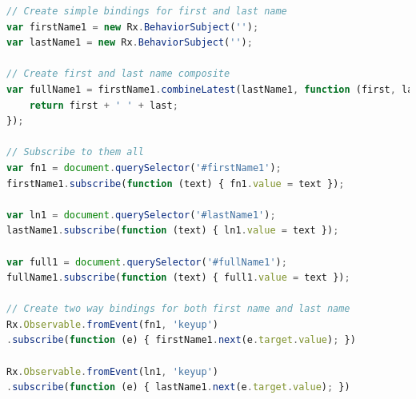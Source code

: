 \begin{lstlisting}[language=JavaScript, caption=RxJS - Databinding example, label={lst:rxjs-data-binding}]
// Create simple bindings for first and last name
var firstName1 = new Rx.BehaviorSubject('');
var lastName1 = new Rx.BehaviorSubject('');

// Create first and last name composite
var fullName1 = firstName1.combineLatest(lastName1, function (first, last) {
	return first + ' ' + last;
});

// Subscribe to them all
var fn1 = document.querySelector('#firstName1');
firstName1.subscribe(function (text) { fn1.value = text });

var ln1 = document.querySelector('#lastName1');
lastName1.subscribe(function (text) { ln1.value = text });

var full1 = document.querySelector('#fullName1');
fullName1.subscribe(function (text) { full1.value = text });

// Create two way bindings for both first name and last name
Rx.Observable.fromEvent(fn1, 'keyup')
.subscribe(function (e) { firstName1.next(e.target.value); })

Rx.Observable.fromEvent(ln1, 'keyup')
.subscribe(function (e) { lastName1.next(e.target.value); })
\end{lstlisting}